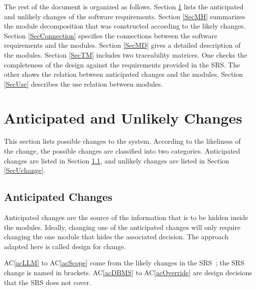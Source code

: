 \documentclass[12pt, titlepage]{article}
\newcommand{\acref}[1]{AC\ref{#1}}
\begin{document}
The rest of the document is organized as follows. Section
\ref{SecChange} lists the anticipated and unlikely changes of the software
requirements. Section \ref{SecMH} summarizes the module decomposition that
was constructed according to the likely changes. Section \ref{SecConnection}
specifies the connections between the software requirements and the
modules. Section \ref{SecMD} gives a detailed description of the
modules. Section \ref{SecTM} includes two traceability matrices. One checks
the completeness of the design against the requirements provided in the SRS. The
other shows the relation between anticipated changes and the modules. Section
\ref{SecUse} describes the use relation between modules.

\section{Anticipated and Unlikely Changes} \label{SecChange}

This section lists possible changes to the system. According to the likeliness
of the change, the possible changes are classified into two
categories. Anticipated changes are listed in Section \ref{SecAchange}, and
unlikely changes are listed in Section \ref{SecUchange}.


\subsection{Anticipated Changes} \label{SecAchange}

Anticipated changes are the source of the information that is to be hidden
inside the modules. Ideally, changing one of the anticipated changes will only
require changing the one module that hides the associated decision. The approach
adapted here is called design for change.

\acref{acLLM} to \acref{acScope} come from the likely changes in the
SRS~\citep{TeamBVSH2026SRS}; the SRS change is named in brackets.
\acref{acDBMS} to \acref{acOverride} are design decisions that the SRS does not
cover.
\end{document}
